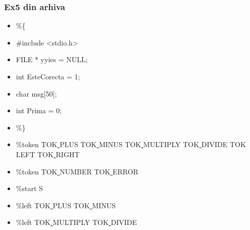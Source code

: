 \documentclass[pdf]{beamer}
\begin{document}
\begin{frame}[shrink=10]
\frametitle{Ex5 din arhiva}
\begin{itemize}
\item
\%\{
\item \qquad \vspace{5mm}
	\#include <stdio.h>
\item \qquad \vspace{5mm}
	FILE * yyies = NULL;
\item \qquad
          int EsteCorecta = 1;
\item \qquad \vspace{5mm}
	char msg[50];
\item \qquad 
	int Prima = 0;
\item
\%\}
\item \vspace{5mm}
\%token TOK\underline{ }PLUS TOK\underline{ }MINUS TOK\underline{ }MULTIPLY TOK\underline{ }DIVIDE TOK\underline{ }LEFT TOK\underline{ }RIGHT
\item
\%token TOK\underline{ }NUMBER TOK\underline{ }ERROR
\item \vspace{5mm}
\%start S
\item \vspace{5mm}
\%left TOK\underline{ }PLUS TOK\underline{ }MINUS
\item
\%left TOK\underline{ }MULTIPLY TOK\underline{ }DIVIDE
\end{itemize}
\end{frame}
\end{document}
